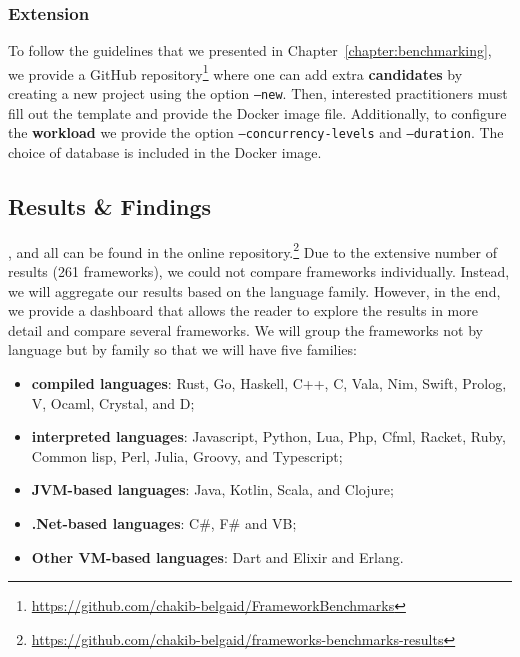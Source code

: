 \subsubsection{Extension}
To follow the guidelines that we presented in Chapter~\ref{chapter:benchmarking}, we provide a GitHub repository\footnote{\url{https://github.com/chakib-belgaid/FrameworkBenchmarks}} where one can add extra \textbf{candidates} by creating a new project using the option \texttt{--new}.
Then, interested practitioners must fill out the template and provide the Docker image file.
Additionally, to configure the \textbf{workload} we provide the option \texttt{--concurrency-levels} and \texttt{--duration}.
The choice of database is included in the Docker image.

\subsection{Results \& Findings}


, and all can be found in the online repository.\footnote{\url{https://github.com/chakib-belgaid/frameworks-benchmarks-results}}
Due to the extensive number of results (261 frameworks), we could not compare frameworks individually. Instead, we will aggregate our results based on the language family. However, in the end, we provide a dashboard that allows the reader to explore the results in more detail and compare several frameworks.
We will group the frameworks not by language but by family so that we will have five families:
\begin{itemize}
    \item \textbf{compiled languages}: Rust, Go, Haskell, C++, C, Vala, Nim, Swift, Prolog, V, Ocaml, Crystal, and D;
    \item \textbf{interpreted languages}: Javascript, Python, Lua, Php, Cfml, Racket, Ruby, Common lisp, Perl, Julia, Groovy, and Typescript;
    \item \textbf{JVM-based languages}: Java, Kotlin, Scala, and Clojure;
    \item \textbf{.Net-based languages}: C\#, F\# and VB;
    \item \textbf{Other VM-based languages}: Dart and Elixir and Erlang.
\end{itemize}

